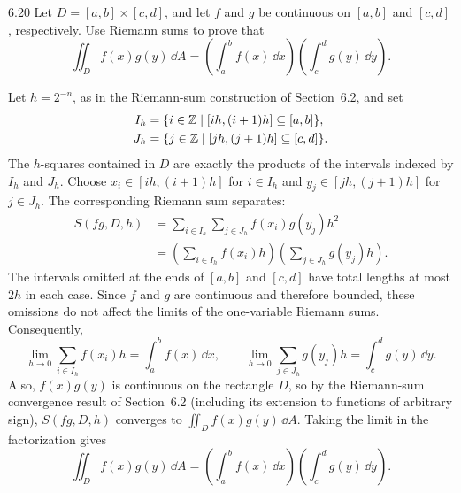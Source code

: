 \documentclass[11pt,oneside]{article}
\begin{document}
\begin{problem}{6.20}
Let $D=[a,b]\times[c,d]$, and let $f$ and $g$ be continuous on
$[a,b]$ and $[c,d]$, respectively. Use Riemann sums to prove that
\[
    \iint_D f(x)g(y)\,\dd A
    =\left(\int_a^b f(x)\,\dd x\right)
     \left(\int_c^d g(y)\,\dd y\right).
\]
\end{problem}

\begin{solution}
Let $h=2^{-n}$, as in the Riemann-sum construction of Section~6.2, and set
\[
\begin{aligned}
    I_h&=\{i\in\mathbb{Z}\mid[ih,(i+1)h]\subseteq[a,b]\},\\
    J_h&=\{j\in\mathbb{Z}\mid[jh,(j+1)h]\subseteq[c,d]\}.
\end{aligned}
\]
The $h$-squares contained in $D$ are exactly the products of the intervals
indexed by $I_h$ and $J_h$. Choose $x_i\in[ih,(i+1)h]$ for $i\in I_h$ and
$y_j\in[jh,(j+1)h]$ for $j\in J_h$. The corresponding Riemann sum separates:
\[
\begin{aligned}
    S(fg,D,h)
    &=\sum_{i\in I_h}\sum_{j\in J_h}f(x_i)g(y_j)h^2\\
    &=\left(\sum_{i\in I_h}f(x_i)h\right)
      \left(\sum_{j\in J_h}g(y_j)h\right).
\end{aligned}
\]
The intervals omitted at the ends of $[a,b]$ and $[c,d]$ have total lengths
at most $2h$ in each case. Since $f$ and $g$ are continuous and therefore
bounded, these omissions do not affect the limits of the one-variable
Riemann sums. Consequently,
\[
    \lim_{h\to0}\sum_{i\in I_h}f(x_i)h=\int_a^b f(x)\,\dd x,
    \qquad
    \lim_{h\to0}\sum_{j\in J_h}g(y_j)h=\int_c^d g(y)\,\dd y.
\]
Also, $f(x)g(y)$ is continuous on the rectangle $D$, so by the Riemann-sum
convergence result of Section~6.2 (including its extension to functions of
arbitrary sign), $S(fg,D,h)$ converges to $\iint_D f(x)g(y)\,\dd A$.
Taking the limit in the factorization gives
\[
    \boxed{\iint_D f(x)g(y)\,\dd A
    =\left(\int_a^b f(x)\,\dd x\right)
     \left(\int_c^d g(y)\,\dd y\right)}.
\]
\end{solution}
\end{document}
